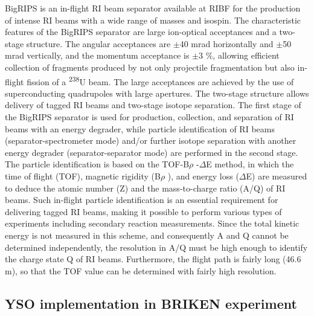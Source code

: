 BigRIPS is an in-flight RI beam separator available at RIBF for the production of intense RI beams with a wide range of masses and isospin. The characteristic features of the BigRIPS separator are large ion-optical acceptances and a two-stage structure. The angular acceptances are $\pm$40 mrad horizontally and $\pm$50 mrad vertically, and the momentum acceptance is
$\pm$3 $\%$, allowing efficient collection of fragments produced by not only projectile fragmentation but also in-flight fission of a
\textsuperscript{238}U beam. The large acceptances are achieved by the use of superconducting quadrupoles with large apertures. The two-stage structure allows delivery of tagged RI beams and two-stage isotope separation. The first stage of the BigRIPS separator is used for production, collection, and separation of RI beams with an energy degrader, while particle identification of RI beams (separator-spectrometer mode) and/or further isotope separation with another energy degrader (separator-separator mode) are performed in the second stage. The particle identification is based on the TOF-B$\rho$ -$\Delta$E method, in which the time of flight (TOF), magnetic rigidity (B$\rho$ ), and energy loss ($\Delta$E) are measured to deduce the atomic number (Z) and the mass-to-charge ratio (A/Q) of RI beams. Such in-flight particle identification is an essential requirement for delivering tagged RI beams, making it possible to perform various types of experiments including secondary reaction measurements. Since the total kinetic energy is not measured in this scheme, and consequently A and Q cannot be determined independently, the resolution in A/Q must be high enough to identify the charge state Q of RI beams. Furthermore, the flight path is fairly long (46.6 m), so that the TOF value can be determined with fairly high resolution.



\subsection{YSO implementation in BRIKEN experiment}

